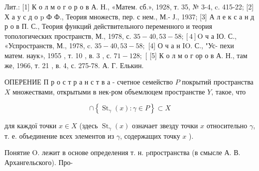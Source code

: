 \documentclass[10pt]{article}
\begin{document}
Лит.: [1] К о л м о г о р о в А. Н., «Матем. сб.», 1928, т. 35, № 3-4, c. 415-22; [2] Х а у с д о $\mathrm{p}$ Ф Ф., Теория множеств, пер. с нем., М.- Ј., 1937; [3] А л е к с а н д р о в П. С., Теория функций действительного переменного и теория топологических
пространств, М., 1978, с. $35-40,53-58 ;[4] \mathrm{O}$ ч а ІО. С., «Успространств, М., 1978, c. $35-40,53-58 ;$ [4] О ч а н IO. С., "Ус-
пехи матем. наук», 1955 , т. 10 , в. 3 , с. $71-128 ;$ [ [5] К о л м о г ор о в А. Н., там же, 1966, т. 21 , в. 4, с. 275-78. А. Г. Елькин.

ОПЕРЕНИЕ П р о с т р а н с т в а - счетное семейство $P$ покрытий пространства $X$ множествами, открытыми в нек-ром объемлюцем пространстве $Y$, такое, что

\[
\cap\left\{\operatorname{St}_{\gamma}(x): \gamma \in P\right\} \subset X
\]

для каждої точки $x \in X$ (здесь $\operatorname{St}_{\gamma}(x)$ означает звезду точки $x$ относительно $\gamma$, т. е. объединение всех элементов из $\gamma$, содержащих точку $x$ ).

Понятие $\mathrm{O}$. лежит в основе определения т. н. pпространства (в смысле А. В. Архангельского). Про-
\end{document}
